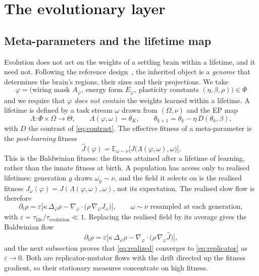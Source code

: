 \documentclass[11pt]{article}
\theoremstyle{definition}
\theoremstyle{remark}
\newcommand{\E}{\mathbb{E}}
\begin{document}
\section{The evolutionary layer}
\label{sec:evo}

\subsection{Meta-parameters and the lifetime map}
Evolution does not act on the weights of a settling brain within a lifetime, and it need not. Following
the reference design~\cite{cadence,evolution}, the inherited object is a \emph{genome} that determines
the brain's regions, their sizes and their projections. We take
\begin{equation}
\varphi=\big(\text{wiring mask }A_\varphi,\ \text{energy form }E_\varphi,\ \text{plasticity constants }(\eta,\beta,\rho)\big)\in\Phi
\end{equation}
and we require that $\varphi$ \emph{does not contain} the weights learned within a lifetime. A lifetime is
defined by a task stream $\omega$ drawn from $(\Omega,\nu)$ and the EP map
\begin{equation}
\Lambda:\Phi\times\Omega\to\Theta,\qquad
\Lambda(\varphi,\omega)=\theta_K,\qquad
\theta_{k+1}=\theta_k-\eta\,D(\theta_k,\beta),
\label{eq:lifetime}
\end{equation}
with $D$ the contrast of \eqref{eq:contrast}. The effective fitness of a meta-parameter is the
\emph{post-learning} fitness
\begin{equation}
\hat J(\varphi)=\E_{\omega\sim\nu}\big[J\big(\Lambda(\varphi,\omega),\omega\big)\big].
\label{eq:baldwin}
\end{equation}
This is the Baldwinian fitness: the fitness attained after a lifetime of learning, rather than the innate
fitness at birth. A population has access only to realised lifetimes: generation $g$ draws
$\omega_g\sim\nu$, and the field it selects on is the realised fitness
$J_{\omega}(\varphi)=J(\Lambda(\varphi,\omega),\omega)$, not its expectation. The realised slow flow is
therefore
\begin{equation}
\partial_t\rho=\varepsilon\Big[\kappa\,\Delta_\varphi\rho-\nabla_\varphi\!\cdot\big(\rho\,\nabla_\varphi J_{\omega}\big)\Big],
\qquad \omega\sim\nu \text{ resampled at each generation},
\label{eq:realized}
\end{equation}
with $\varepsilon=\tau_{\text{life}}/\tau_{\text{evolution}}\ll1$. Replacing the realised field by its
average gives the Baldwinian flow
\begin{equation}
\partial_t\rho=\varepsilon\Big[\kappa\,\Delta_\varphi\rho-\nabla_\varphi\!\cdot\big(\rho\,\nabla_\varphi\hat J\big)\Big],
\label{eq:replicator}
\end{equation}
and the next subsection proves that \eqref{eq:realized} converges to \eqref{eq:replicator} as
$\varepsilon\to0$. Both are replicator-mutator flows with the drift directed up the fitness gradient, so
their stationary measures concentrate on high fitness.
\end{document}
